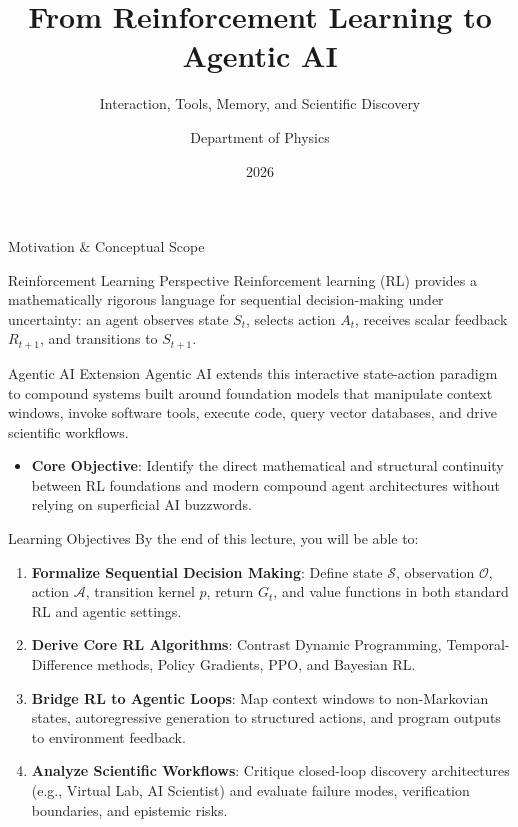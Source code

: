 \documentclass[10pt, aspectratio=169]{beamer}
\title[FYS4411: RL to Agentic AI]{From Reinforcement Learning to Agentic AI}
\subtitle{Interaction, Tools, Memory, and Scientific Discovery}
\author[FYS4411]{Department of Physics}
\institute[UiO]{University of Oslo}
\date{2026}
\begin{document}

\begin{frame}
  \titlepage
\end{frame}

\begin{frame}{Motivation \& Conceptual Scope}
  \begin{block}{Reinforcement Learning Perspective}
    Reinforcement learning (RL) provides a mathematically rigorous language for sequential decision-making under uncertainty: an agent observes state $S_t$, selects action $A_t$, receives scalar feedback $R_{t+1}$, and transitions to $S_{t+1}$.
  \end{block}

  \begin{block}{Agentic AI Extension}
    Agentic AI extends this interactive state-action paradigm to compound systems built around foundation models that manipulate context windows, invoke software tools, execute code, query vector databases, and drive scientific workflows.
  \end{block}

  \begin{itemize}
    \item \textbf{Core Objective}: Identify the direct mathematical and structural continuity between RL foundations and modern compound agent architectures without relying on superficial AI buzzwords.
  \end{itemize}
\end{frame}

\begin{frame}{Learning Objectives}
  By the end of this lecture, you will be able to:
  \begin{enumerate}
    \item \textbf{Formalize Sequential Decision Making}: Define state $\mathcal{S}$, observation $\mathcal{O}$, action $\mathcal{A}$, transition kernel $p$, return $G_t$, and value functions in both standard RL and agentic settings.
    \item \textbf{Derive Core RL Algorithms}: Contrast Dynamic Programming, Temporal-Difference methods, Policy Gradients, PPO, and Bayesian RL.
    \item \textbf{Bridge RL to Agentic Loops}: Map context windows to non-Markovian states, autoregressive generation to structured actions, and program outputs to environment feedback.
    \item \textbf{Analyze Scientific Workflows}: Critique closed-loop discovery architectures (e.g., Virtual Lab, AI Scientist) and evaluate failure modes, verification boundaries, and epistemic risks.
  \end{enumerate}
\end{frame}
\end{document}
